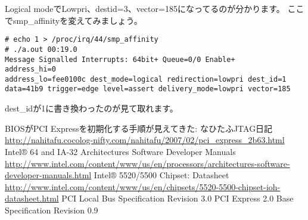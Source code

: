 Logical modeでLowpri、destid=3、vector=185になってるのが分かります。
ここでsmp\_affinityを変えてみましょう。

\begin{program}[H]\centering
\begin{verbatim}
# echo 1 > /proc/irq/44/smp_affinity
# ./a.out 00:19.0
Message Signalled Interrupts: 64bit+ Queue=0/0 Enable+
address_hi=0
address_lo=fee0100c dest_mode=logical redirection=lowpri dest_id=1
data=41b9 trigger=edge level=assert delivery_mode=lowpri vector=185
\end{verbatim}
\end{program}
dest\_idが1に書き換わったのが見て取れます。

\begin{thebibliography}{5}
     BIOSがPCI Expressを初期化する手順が見えてきた: なひたふJTAG日記 \url{http://nahitafu.cocolog-nifty.com/nahitafu/2007/02/pci_express_2b63.html}
    \bibitem{} Intel® 64 and IA-32 Architectures Software Developer Manuals \url{http://www.intel.com/content/www/us/en/processors/architectures-software-developer-manuals.html}
    \bibitem{} Intel® 5520/5500 Chipset: Datasheet \url{http://www.intel.com/content/www/us/en/chipsets/5520-5500-chipset-ioh-datasheet.html}
    \bibitem{} PCI Local Bus Specification Revision 3.0
    \bibitem{} PCI Express 2.0 Base Specification Revision 0.9
\end{thebibliography}


